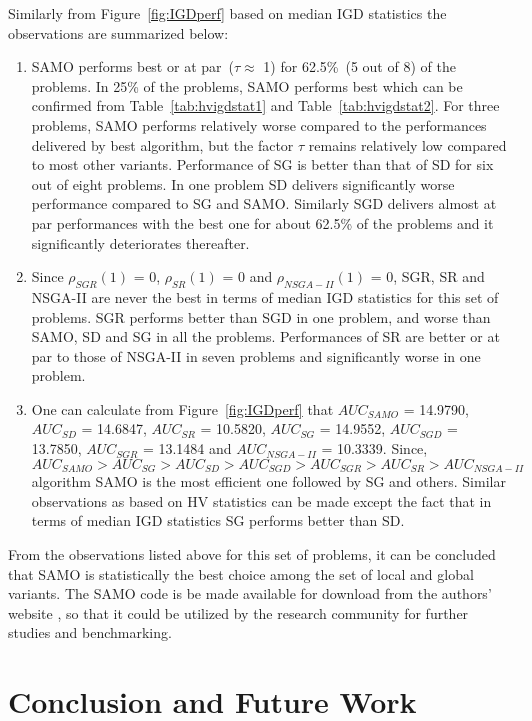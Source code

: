 Similarly from Figure~\ref{fig:IGDperf} based on median IGD statistics the observations are summarized below:

\begin{enumerate} 
	
	\item SAMO performs best or at par~($\tau\approx$ 1) for 62.5\%~(5 out of 8) of the problems. In 25\% of the problems, SAMO performs best which can be confirmed from  Table~\ref{tab:hvigdstat1} and Table~\ref{tab:hvigdstat2}. For three problems, SAMO performs relatively worse compared to the performances delivered by best algorithm, but the factor $\tau$ remains relatively low compared to most other variants. Performance of SG is better than that of SD for six out of eight problems. In one problem SD delivers significantly worse performance compared to SG and SAMO. Similarly SGD delivers almost at par performances with the best one for about 62.5\% of the problems and it significantly deteriorates thereafter.
	\item Since $\rho_{SGR}(1)$ = 0, $\rho_{SR}(1)$ = 0 and $\rho_{NSGA-II}(1)$ = 0, SGR, SR and NSGA-II are never the best in terms of median IGD statistics for this set of problems.  SGR performs better than SGD in one problem, and worse than SAMO, SD and SG in all the problems. Performances of SR are better or at par to those of NSGA-II in seven problems and significantly worse in one problem.
	\item One can calculate from Figure~\ref{fig:IGDperf} that $AUC_{SAMO}$ = 14.9790, $AUC_{SD}$ = 14.6847, $AUC_{SR}$ = 10.5820, $AUC_{SG}$ = 14.9552, $AUC_{SGD}$ = 13.7850, $AUC_{SGR}$ = 13.1484 and $AUC_{NSGA-II}$ = 10.3339. Since, $AUC_{SAMO} > AUC_{SG} > AUC_{SD} > AUC_{SGD} > AUC_{SGR} > AUC_{SR} > AUC_{NSGA-II}$ algorithm SAMO is the most efficient one followed by SG and others. Similar observations as based on HV statistics can be made except the fact that in terms of median IGD statistics SG performs better than SD.
\end{enumerate}

From the observations listed above for this set of problems, it can be concluded that SAMO is statistically the best choice among the set of local and global variants. The SAMO code is be made available for download from the authors' website \cite{MDOsamo}, so that it could be utilized by the research community for further studies and benchmarking.


\section{Conclusion and Future Work}
\label{sec:conc}

